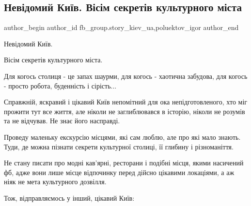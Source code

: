  
 
 
 
 
 
\subsection{Невідомий Київ. Вісім секретів культурного міста}
\label{sec:28_01_2022.fb.fb_group.story_kiev_ua.1.kiev_visim_sekretiv}
 
\ifcmt
 author_begin
   author_id fb_group.story_kiev_ua,poluektov_igor
 author_end
\fi

Невідомий Київ.

Вісім секретів культурного міста.

Для когось столиця - це запах шаурми, для когось - хаотична забудова, для
когось - просто робота, буденність і сірість...

Справжній, яскравий і цікавий Київ непомітний для ока непідготовленого, хто міг
прожити тут все життя, але ніколи не заглиблювався в історію, ніколи не розумів
та не відчував. Не знає його насправді.


Проведу маленьку екскурсію місцями, які сам люблю, але про які мало знають.
Туди, де можна пізнати секрети культурної столиці, її глибину і різноманіття. 

Не стану писати про модні кав’ярні, ресторани і подібні місця, якими насичений
фб, адже вони лише місце відпочинку перед дійсно цікавими локаціями, а аж ніяк
не мета культурного дозвілля. 

Тож, відправляємось у інший, цікавий Київ:


